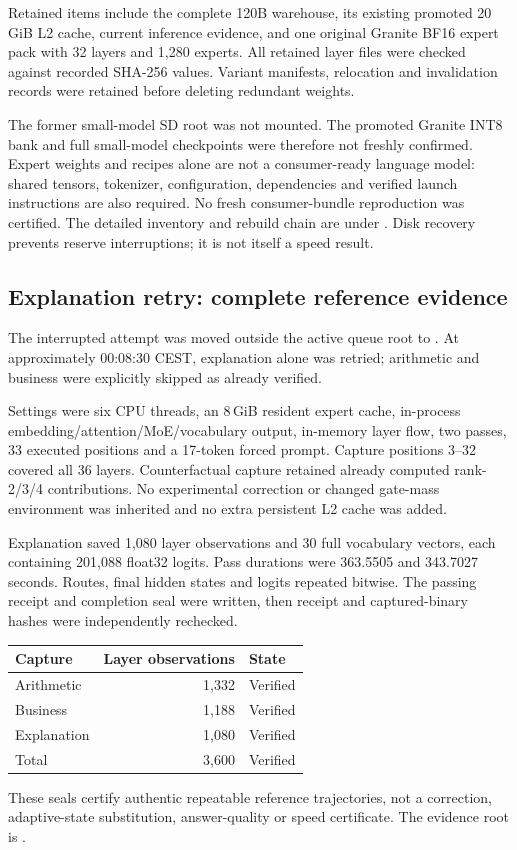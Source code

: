 Retained items include the complete 120B warehouse, its existing promoted
20\,GiB L2 cache, current inference evidence, and one original Granite BF16
expert pack with 32 layers and 1,280 experts. All retained layer files were
checked against recorded SHA-256 values. Variant manifests, relocation and
invalidation records were retained before deleting redundant weights.

The former small-model SD root was not mounted. The promoted Granite INT8
bank and full small-model checkpoints were therefore not freshly confirmed.
Expert weights and recipes alone are not a consumer-ready language model:
shared tensors, tokenizer, configuration, dependencies and verified launch
instructions are also required. No fresh consumer-bundle reproduction was
certified. The detailed inventory and rebuild chain are under
.
Disk recovery prevents reserve interruptions; it is not itself a speed result.

\subsection{Explanation retry: complete reference evidence}
The interrupted attempt was moved outside the active queue root to
.
At approximately 00:08:30 CEST, explanation alone was retried; arithmetic
and business were explicitly skipped as already verified.

Settings were six CPU threads, an 8\,GiB resident expert cache, in-process
embedding/attention/MoE/vocabulary output, in-memory layer flow, two passes,
33 executed positions and a 17-token forced prompt. Capture positions 3--32
covered all 36 layers. Counterfactual capture retained already computed
rank-2/3/4 contributions. No experimental correction or changed gate-mass
environment was inherited and no extra persistent L2 cache was added.

Explanation saved 1,080 layer observations and 30 full vocabulary vectors,
each containing 201,088 float32 logits. Pass durations were 363.5505 and
343.7027 seconds. Routes, final hidden states and logits repeated bitwise.
The passing receipt and completion seal were written, then receipt and
captured-binary hashes were independently rechecked.
\begin{center}
\begin{tabular}{lrl}
\toprule
Capture & Layer observations & State \\
\midrule
Arithmetic & 1,332 & Verified \\
Business & 1,188 & Verified \\
Explanation & 1,080 & Verified \\
Total & 3,600 & Verified \\
\bottomrule
\end{tabular}
\end{center}
These seals certify authentic repeatable reference trajectories, not a
correction, adaptive-state substitution, answer-quality or speed certificate.
The evidence root is
.

